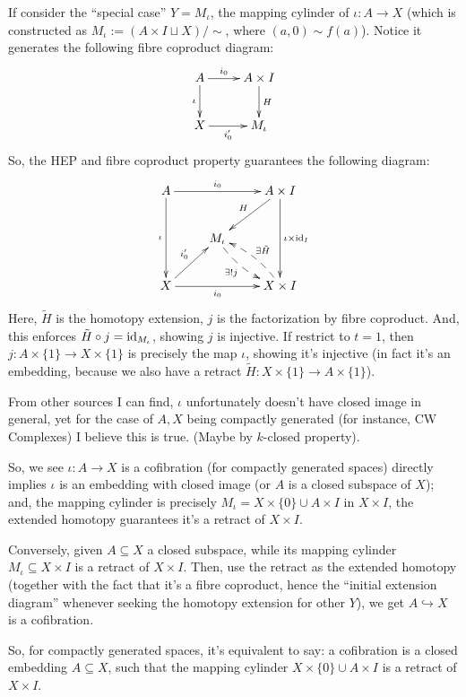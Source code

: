 \documentclass{article}
\begin{document}
If consider the ``special case'' $Y= M_\iota$, the mapping cylinder of $\iota:A\rightarrow X$ (which is constructed as $M_\iota := (A\times I\sqcup X)/\sim$, where $(a,0)\sim f(a)$). Notice it generates the following fibre coproduct diagram:
\[\xymatrix{
    A \ar[d]_-{\iota} \ar[r]^-{i_0} & A\times I \ar[d]^-{H}\\
    X \ar[r]_-{i_0'} & M_\iota
}\]
So, the HEP and fibre coproduct property guarantees the following diagram:
\[\xymatrix{
    A \ar[dd]_-{\iota} \ar[rr]^-{i_0} && A\times I \ar[dl]_-{H} \ar[dd]^-{\iota\times \id_I}\\
    & M_\iota \ar@{-->}@/_{.5pc}/[dr]_-{\exists ! j}\\
    X \ar[ur]^-{i_0'} \ar[rr]_-{i_0} && X\times I \ar@{-->}@/_{.5pc}/[ul]_-{\exists \tilde{H}}
} \]
Here, $\tilde{H}$ is the homotopy extension, $j$ is the factorization by fibre coproduct. And, this enforces $\tilde{H}\circ j = \mathrm{id}_{M_\iota}$, showing $j$ is injective. If restrict to $t=1$, then $j:A\times \{1\}\rightarrow X\times\{1\}$ is precisely the map $\iota$, showing it's injective (in fact it's an embedding, because we also have a retract $\tilde{H}:X\times\{1\}\rightarrow A\times\{1\}$).

From other sources I can find, $\iota$ unfortunately doesn't have closed image in general, yet for the case of $A,X$ being compactly generated (for instance, CW Complexes) I believe this is true. (Maybe by $k$-closed property).

\hfil

So, we see $\iota:A\rightarrow X$ is a cofibration (for compactly generated spaces) directly implies $\iota$ is an embedding with closed image (or $A$ is a closed subspace of $X$); and, the mapping cylinder is precisely $M_\iota=X\times \{0\}\cup A\times I$ in $X\times I$, the extended homotopy guarantees it's a retract of $X\times I$.

Conversely, given $A\subseteq X$ a closed subspace, while its mapping cylinder $M_\iota\subseteq X\times I$ is a retract of $X\times I$. Then, use the retract as the extended homotopy (together with the fact that it's a fibre coproduct, hence the ``initial extension diagram'' whenever seeking the homotopy extension for other $Y$), we get $A\hookrightarrow X$ is a cofibration.

So, for compactly generated spaces, it's equivalent to say: a cofibration is a closed embedding $A\subseteq X$, such that the mapping cylinder $X\times \{0\}\cup A\times I$ is a retract of $X\times I$.
\end{document}

